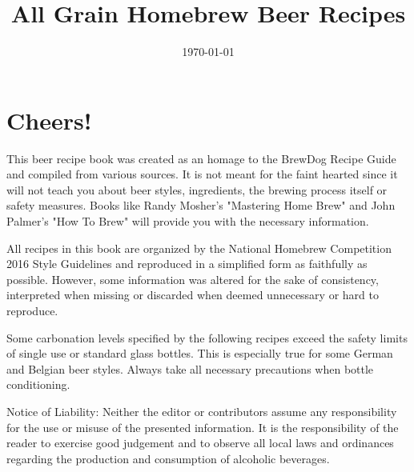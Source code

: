 \documentclass[parskip=half,fontsize=9pt,oneside,toc=chapterentrydotfill]{scrbook}
\begin{document}
\title{All Grain Homebrew Beer Recipes}
\date{\today}
\publishers{Editor: Thomas Ascher}
\dedication{Dedicated to BrauCampus Graz Hobbybrauer Stammtisch}
\maketitle

\frontmatter

\chapter*{Cheers!}

This beer recipe book was created as an homage to the BrewDog Recipe
Guide and compiled from various sources. It is not meant for the faint hearted
since it will not teach you about beer styles, ingredients, the brewing
process itself or safety measures. Books like Randy Mosher's "Mastering Home Brew"
and John Palmer's "How To Brew" will provide you with the necessary information.

All recipes in this book are organized by the National Homebrew Competition
2016 Style Guidelines and reproduced in a simplified form as faithfully
as possible. However, some information was altered for the sake of consistency,
interpreted when missing or discarded when deemed unnecessary or hard to reproduce.

Some carbonation levels specified by the following recipes exceed the safety
limits of single use or standard glass bottles. This is especially true for some
German and Belgian beer styles. Always take all necessary precautions when
bottle conditioning.

Notice of Liability: Neither the editor or contributors assume any responsibility
for the use or misuse of the presented information. It is the responsibility of
the reader to exercise good judgement and to observe all local laws and ordinances
regarding the production and consumption of alcoholic beverages.

\tableofcontents

\mainmatter









\end{document}
